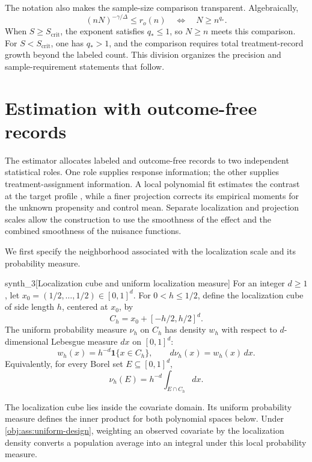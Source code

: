 \documentclass[11pt]{article}
\begin{document}
The notation also makes the sample-size comparison transparent. Algebraically,
\[
(nN)^{-\gamma/\Delta}\le r_o(n)
\quad\Longleftrightarrow\quad
N\ge n^{q_*}.
\]
When \(S\ge S_{\mathrm{crit}}\), the exponent satisfies \(q_*\le1\), so \(N\ge n\) meets this comparison. For \(S<S_{\mathrm{crit}}\), one has \(q_*>1\), and the comparison requires total treatment-record growth beyond the labeled count. This division organizes the precision and sample-requirement statements that follow.


\section{Estimation with outcome-free records}\label{sec:estimation}

The estimator allocates labeled and outcome-free records to two independent statistical roles. One role supplies response information; the other supplies treatment-assignment information. A local polynomial fit estimates the contrast at the target profile , while a finer projection corrects its empirical moments for the unknown propensity and control mean. Separate localization and projection scales allow the construction to use the smoothness of the effect and the combined smoothness of the nuisance functions.

We first specify the neighborhood associated with the localization scale  and its probability measure.

\begin{definitionv}{synth_3}[Localization cube and uniform localization measure]
For an integer \(d\ge1\), let \(x_0=(1/2,\ldots,1/2)\in[0,1]^d\). For \(0<h\le1/2\), define the localization cube of side length \(h\), centered at \(x_0\), by
\[
C_h=x_0+[-h/2,h/2]^d.
\]
The uniform probability measure \(\nu_h\) on \(C_h\) has density \(w_h\) with respect to \(d\)-dimensional Lebesgue measure \(dx\) on \([0,1]^d\):
\[
w_h(x)=h^{-d}\mathbf1\{x\in C_h\},
\qquad
d\nu_h(x)=w_h(x)\,dx.
\]
Equivalently, for every Borel set \(E\subseteq[0,1]^d\),
\[
\nu_h(E)=h^{-d}\int_{E\cap C_h}dx.
\]
\end{definitionv}

The localization cube  lies inside the covariate domain. Its uniform probability measure  defines the inner product for both polynomial spaces below. Under \cref{obj:ass:uniform-design}, weighting an observed covariate by the localization density  converts a population average into an integral under this local probability measure.
\end{document}
